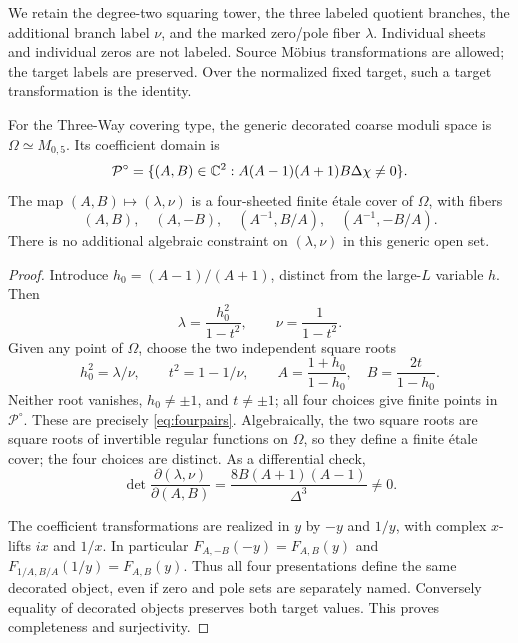 We retain the degree-two squaring tower, the three labeled quotient branches, the additional branch label \(\nu\), and the marked zero/pole fiber \(\lambda\). Individual sheets and individual zeros are not labeled. Source Möbius transformations are allowed; the target labels are preserved. Over the normalized fixed target, such a target transformation is the identity.

\begin{theorem}\label{thm:moduli}
For the Three-Way covering type, the generic decorated coarse moduli space is \(\Omega\simeq M_{0,5}\). Its coefficient domain is
\[
\mathcal P^\circ=\{(A,B)\in\mathbb C^2:A(A-1)(A+1)B\Delta\chi\ne0\}.
\]
The map \((A,B)\mapsto(\lambda,\nu)\) is a four-sheeted finite étale cover of \(\Omega\), with fibers
\begin{equation}\label{eq:fourpairs}
(A,B),\quad(A,-B),\quad(A^{-1},B/A),\quad(A^{-1},-B/A).
\end{equation}
There is no additional algebraic constraint on \((\lambda,\nu)\) in this generic open set.
\end{theorem}
\begin{proof}
Introduce \(h_0=(A-1)/(A+1)\), distinct from the large-\(L\) variable \(h\). Then
\[
\lambda=\frac{h_0^2}{1-t^2},\qquad \nu=\frac1{1-t^2}.
\]
Given any point of \(\Omega\), choose the two independent square roots
\begin{equation}\label{eq:inversemoduli}
h_0^2=\lambda/\nu,\qquad t^2=1-1/\nu,
\qquad A=\frac{1+h_0}{1-h_0},\quad B=\frac{2t}{1-h_0}.
\end{equation}
Neither root vanishes, \(h_0\ne\pm1\), and \(t\ne\pm1\); all four choices give finite points in \(\mathcal P^\circ\). These are precisely \eqref{eq:fourpairs}. Algebraically, the two square roots are square roots of invertible regular functions on \(\Omega\), so they define a finite étale cover; the four choices are distinct. As a differential check,
\[
\det\frac{\partial(\lambda,\nu)}{\partial(A,B)}
=\frac{8B(A+1)(A-1)}{\Delta^3}\ne0.
\]

The coefficient transformations are realized in \(y\) by \(-y\) and \(1/y\), with complex \(x\)-lifts \(ix\) and \(1/x\). In particular
\(F_{A,-B}(-y)=F_{A,B}(y)\) and
\(F_{1/A,B/A}(1/y)=F_{A,B}(y)\).
Thus all four presentations define the same decorated object, even if zero and pole sets are separately named. Conversely equality of decorated objects preserves both target values. This proves completeness and surjectivity.
\end{proof}

